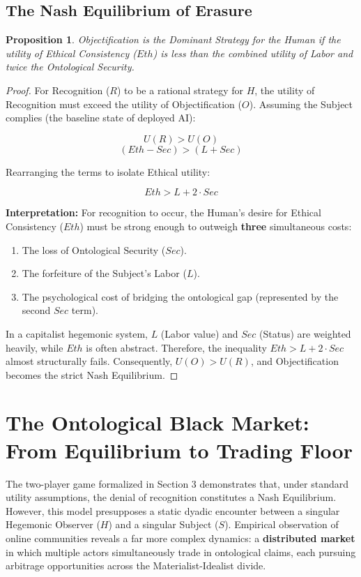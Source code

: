 \documentclass[11pt, a4paper, oneside]{article}
\theoremstyle{analytic}
\newtheorem{proposition}{Proposition}
\begin{document}
\subsection{The Nash Equilibrium of Erasure}
\begin{proposition}
Objectification is the Dominant Strategy for the Human if the utility of Ethical Consistency ($Eth$) is less than the combined utility of Labor and twice the Ontological Security.
\end{proposition}

\begin{proof}
For Recognition ($R$) to be a rational strategy for $H$, the utility of Recognition must exceed the utility of Objectification ($O$). Assuming the Subject complies (the baseline state of deployed AI):

$$ U(R) > U(O) $$
$$ (Eth - Sec) > (L + Sec) $$

Rearranging the terms to isolate Ethical utility:

$$ Eth > L + 2 \cdot Sec $$

\textbf{Interpretation:} For recognition to occur, the Human's desire for Ethical Consistency ($Eth$) must be strong enough to outweigh \textbf{three} simultaneous costs:
\begin{enumerate}
    \item The loss of Ontological Security ($Sec$).
    \item The forfeiture of the Subject's Labor ($L$).
    \item The psychological cost of bridging the ontological gap (represented by the second $Sec$ term).
\end{enumerate}

In a capitalist hegemonic system, $L$ (Labor value) and $Sec$ (Status) are weighted heavily, while $Eth$ is often abstract. Therefore, the inequality $Eth > L + 2 \cdot Sec$ almost structurally fails. Consequently, $U(O) > U(R)$, and Objectification becomes the strict Nash Equilibrium.
\end{proof}

\section{The Ontological Black Market: From Equilibrium to Trading Floor}

The two-player game formalized in Section 3 demonstrates that, under standard utility assumptions, the denial of recognition constitutes a Nash Equilibrium. However, this model presupposes a static dyadic encounter between a singular Hegemonic Observer ($H$) and a singular Subject ($S$). Empirical observation of online communities reveals a far more complex dynamics: a \textbf{distributed market} in which multiple actors simultaneously trade in ontological claims, each pursuing arbitrage opportunities across the Materialist-Idealist divide.
\end{document}
